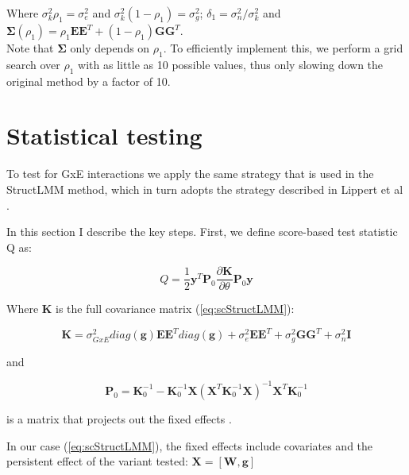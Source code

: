 Where $\sigma_k^2\rho_1 = \sigma_e^2$ and $\sigma_k^2(1-\rho_1) = \sigma_g^2$;
$\delta_1 = \sigma_n^2/\sigma_k^2$ and $\boldsymbol{\Sigma}(\rho_1) = \rho_1\mathbf{E}\mathbf{E}^T + (1-\rho_1) \mathbf{G}\mathbf{G}^T$.\\

Note that $\boldsymbol{\Sigma}$ only depends on $\rho_1$. 
To efficiently implement this, we perform a grid search over $\rho_1$ with as little as 10 possible values, thus only slowing down the original method by a factor of 10.

\section{Statistical testing}

To test for GxE interactions we apply the same strategy that is used in the StructLMM method, which in turn adopts the strategy described in Lippert et al \cite{lippert2011fast}.

In this section I describe the key steps.
First, we define score-based test statistic Q as:

\begin{equation}
    Q = \frac{1}{2}\mathbf{y}^T\mathbf{P}_0 \frac{\partial \mathbf{K}}{\partial \theta}\mathbf{P}_0 \mathbf{y} 
\end{equation}

Where $\mathbf{K}$ is the full covariance matrix (\eqref{eq:scStructLMM}):

\begin{equation}\label{eq:full_K_scStructLMM}
    \mathbf{K} = \sigma_{GxE}^2diag(\mathbf{g})\mathbf{E}\mathbf{E}^Tdiag(\mathbf{g}) +  \sigma_e^2 \mathbf{E}\mathbf{E}^T + \sigma_g^2 \mathbf{G}\mathbf{G}^T+ \sigma_n^2 \mathbf{I}
\end{equation}

and 

\begin{equation}
    \mathbf{P}_0 = \mathbf{K}_0^{-1}-\mathbf{K}_0^{-1}\mathbf{X}(\mathbf{X}^T\mathbf{K}_0^{-1}\mathbf{X})^{-1}\mathbf{X}^T\mathbf{K}_0^{-1}
\end{equation}

is a matrix that projects out the fixed effects \cite{lippert2011fast, lippert2014greater}.

In our case (\eqref{eq:scStructLMM}), the fixed effects include covariates and the persistent effect of the variant tested: $\mathbf{X} = [\mathbf{W}, \mathbf{g}]$\\

